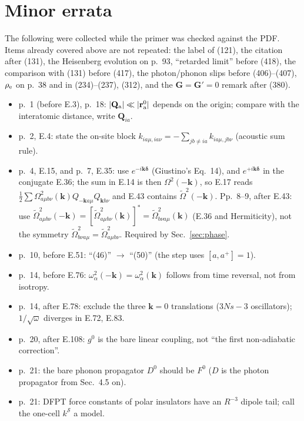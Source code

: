\documentclass[11pt]{article}
\begin{document}
\section{Minor errata}\label{sec:minor}
The following were collected while the primer was checked against the PDF. Items already covered above
are not repeated: the label of (121), the citation after (131), the Heisenberg evolution on p.~93,
``retarded limit'' before (418), the comparison with (131) before (417), the photon/phonon slips before
(406)--(407), $\rho_{\rm e}$ on p.~38 and in (234)--(237), (312), and the $\mathbf G=\mathbf G'=0$ remark after
(380).
\begin{itemize}\setlength{\itemsep}{0pt}
\item p.~1 (before E.3), p.~18: $|\mathbf Q_{\rm a}|\ll|\mathbf r^0_{\rm a}|$ depends on the origin; compare with the interatomic distance, write $\mathbf Q_{ia}$.
\item p.~2, E.4: state the on-site block $k_{ia\mu,ia\nu}=-\sum_{jb\neq ia}k_{ia\mu,jb\nu}$ (acoustic sum rule).
\item p.~4, E.15, and p.~7, E.35: use $e^{-i\mathbf k\bm{\delta}}$ (Giustino's Eq.~14), and $e^{+i\mathbf k\bm{\delta}}$ in the conjugate E.36; the sum in E.14 is then $\Omega^2(-\mathbf k)$, so E.17 reads $\frac12\sum\Omega^2_{a\mu b\nu}(\mathbf k)Q_{-\mathbf k a\mu}Q_{\mathbf k b\nu}$ and E.43 contains $\tilde\Omega^2(-\mathbf k)$. Pp.~8--9, after E.43: use $\tilde\Omega^2_{a\mu b\nu}(-\mathbf k)=[\tilde\Omega^2_{a\mu b\nu}(\mathbf k)]^*=\tilde\Omega^2_{b\nu a\mu}(\mathbf k)$ (E.36 and Hermiticity), not the symmetry $\tilde\Omega^2_{b\nu a\mu}=\tilde\Omega^2_{a\mu b\nu}$. Required by Sec.~\ref{sec:phase}.
\item p.~10, before E.51: ``(46)'' $\to$ ``(50)'' (the step uses $[a,a^+]=1$).
\item p.~14, before E.76: $\omega^2_\alpha(-\mathbf k)=\omega^2_\alpha(\mathbf k)$ follows from time reversal, not from isotropy.
\item p.~14, after E.78: exclude the three $\mathbf k=0$ translations ($3Ns-3$ oscillators); $1/\sqrt\omega$ diverges in E.72, E.83.
\item p.~20, after E.108: $g^0$ is the bare linear coupling, not ``the first non-adiabatic correction''.
\item p.~21: the bare phonon propagator $D^0$ should be $F^0$ ($D$ is the photon propagator from Sec.~4.5 on).
\item p.~21: DFPT force constants of polar insulators have an $R^{-3}$ dipole tail; call the one-cell $k^{\mathcal S}$ a model.

\end{itemize}
\end{document}
